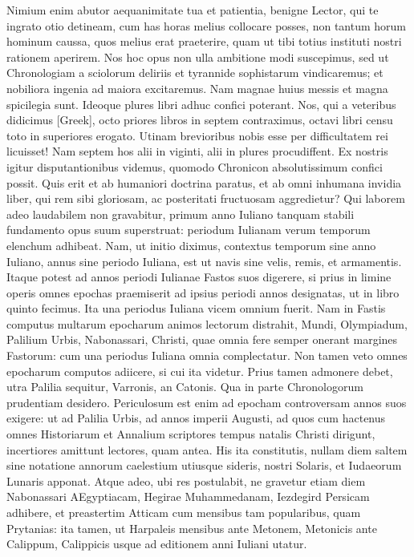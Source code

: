 \begin{parnumbers}
{}
\lnr{}Nimium enim abutor aequanimitate
tua et patientia, benigne Lector, qui te ingrato otio detineam,
cum has horas melius collocare posses, non tantum horum
hominum caussa, quos melius erat praeterire, quam ut tibi totius instituti
nostri rationem aperirem.
\lnr{}Nos hoc opus non ulla ambitione
modi suscepimus, sed ut Chronologiam a sciolorum deliriis et tyrannide
sophistarum vindicaremus; et nobiliora ingenia ad maiora excitaremus.
\lnr{}Nam magnae huius messis et magna spicilegia sunt.
\lnr{}Ideoque
plures libri adhuc confici poterant.
\lnr{}Nos, qui a veteribus didicimus
\textgreek{[Greek]}, octo priores libros in septem contraximus,
octavi libri censu toto in superiores erogato.
\lnr{}Utinam brevioribus nobis esse per difficultatem rei licuisset!
\lnr{}Nam septem hos alii
in viginti, alii in plures procudiffent.
\lnr{}Ex nostris igitur disputantionibus
videmus, quomodo Chronicon absolutissimum confici possit.
\lnr{}Quis
erit et ab humaniori doctrina paratus, et ab omni inhumana invidia
liber, qui rem sibi gloriosam, ac posteritati fructuosam aggredietur?
\lnr{}Qui laborem adeo laudabilem non gravabitur, primum anno Iuliano
tanquam stabili fundamento opus suum superstruat: periodum Iulianam
verum temporum elenchum adhibeat.
\lnr{}Nam, ut initio diximus,
contextus temporum sine anno Iuliano, annus sine periodo Iuliana,
est ut navis sine velis, remis, et armamentis.
\lnr{}Itaque potest ad
annos periodi Iulianae Fastos suos digerere, si prius in limine operis
omnes epochas praemiserit ad ipsius periodi annos designatas, ut in
libro quinto fecimus.
\lnr{}Ita una periodus Iuliana vicem omnium fuerit.
\lnr{}Nam in Fastis computus multarum epocharum animos lectorum distrahit,
Mundi, Olympiadum, Palilium Urbis, Nabonassari, Christi,
quae omnia fere semper onerant margines Fastorum: cum una periodus
Iuliana omnia complectatur.
\lnr{}Non tamen veto omnes epocharum
computos adiicere, si cui ita videtur.
\lnr{}Prius tamen admonere debet,
utra Palilia sequitur, Varronis, an Catonis.
\lnr{}Qua in parte Chronologorum
prudentiam desidero.
\lnr{}Periculosum est enim ad epocham
controversam annos suos exigere: ut ad Palilia Urbis, ad annos imperii
Augusti, ad quos cum hactenus omnes Historiarum et Annalium
scriptores tempus natalis Christi dirigunt, incertiores amittunt
lectores, quam antea.
\lnr{}His ita constitutis, nullam diem saltem sine
notatione annorum caelestium utiusque sideris, nostri Solaris, et Iudaeorum
Lunaris apponat.
\lnr{}Atque adeo, ubi res postulabit, ne gravetur
etiam diem Nabonassari AEgyptiacam, Hegirae Muhammedanam,
Iezdegird Persicam adhibere, et preastertim Atticam cum mensibus
tam popularibus, quam Prytanias: ita tamen, ut Harpaleis mensibus
ante Metonem, Metonicis ante Calippum, Calippicis usque ad
editionem anni Iuliani utatur.


\end{parnumbers}
